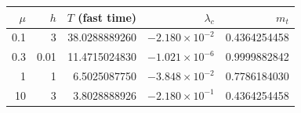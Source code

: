 \begin{tabular}{rrrrr}
\toprule
$\mu$ & $h$ & $T$ (fast time) & $\lambda_c$ & $m_t$ \\
\midrule
0.1 & 3 & 38.0288889260 & $-2.180\times10^{-2}$ & 0.4364254458 \\
0.3 & 0.01 & 11.4715024830 & $-1.021\times10^{-6}$ & 0.9999882842 \\
1 & 1 & 6.5025087750 & $-3.848\times10^{-2}$ & 0.7786184030 \\
10 & 3 & 3.8028888926 & $-2.180\times10^{-1}$ & 0.4364254458 \\
\bottomrule
\end{tabular}
